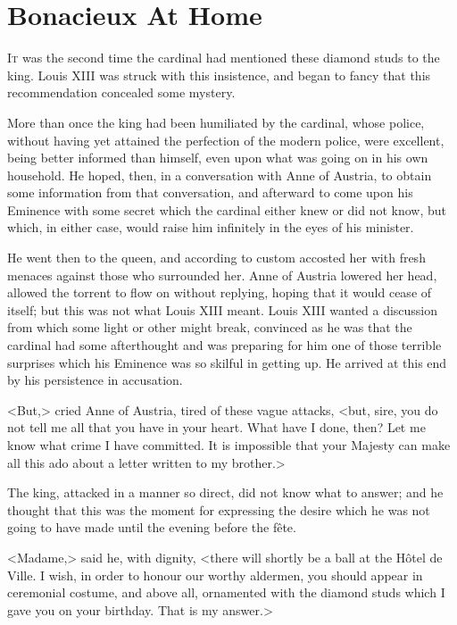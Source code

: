 
\chapter{Bonacieux At Home}

\lettrine[]{I}{t} was the second time the cardinal had mentioned these diamond studs to the king. Louis XIII was struck with this insistence, and began to fancy that this recommendation concealed some mystery. 

More than once the king had been humiliated by the cardinal, whose police, without having yet attained the perfection of the modern police, were excellent, being better informed than himself, even upon what was going on in his own household. He hoped, then, in a conversation with Anne of Austria, to obtain some information from that conversation, and afterward to come upon his Eminence with some secret which the cardinal either knew or did not know, but which, in either case, would raise him infinitely in the eyes of his minister. 

He went then to the queen, and according to custom accosted her with fresh menaces against those who surrounded her. Anne of Austria lowered her head, allowed the torrent to flow on without replying, hoping that it would cease of itself; but this was not what Louis XIII meant. Louis XIII wanted a discussion from which some light or other might break, convinced as he was that the cardinal had some afterthought and was preparing for him one of those terrible surprises which his Eminence was so skilful in getting up. He arrived at this end by his persistence in accusation. 

<But,> cried Anne of Austria, tired of these vague attacks, <but, sire, you do not tell me all that you have in your heart. What have I done, then? Let me know what crime I have committed. It is impossible that your Majesty can make all this ado about a letter written to my brother.> 

The king, attacked in a manner so direct, did not know what to answer; and he thought that this was the moment for expressing the desire which he was not going to have made until the evening before the fête. 

<Madame,> said he, with dignity, <there will shortly be a ball at the Hôtel de Ville. I wish, in order to honour our worthy aldermen, you should appear in ceremonial costume, and above all, ornamented with the diamond studs which I gave you on your birthday. That is my answer.> 

